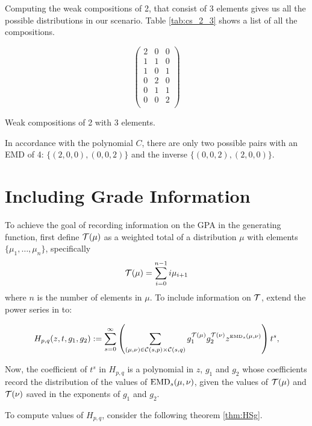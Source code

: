 \documentclass[12pt,letterpaper,oneside,openany]{book}
\begin{document}
Computing the weak compositions of 2, that consist of 3 elements gives us all the possible distributions in our scenario. Table \ref{tab:cs_2_3} shows a list of all the compositions.

\begin{table}
	\centering
	
	$$\begin{pmatrix}
	2 & 0 & 0 \\
	1 & 1 & 0 \\
	1 & 0 & 1 \\
	0 & 2 & 0 \\
	0 & 1 & 1 \\
	0 & 0 & 2 \\
	\end{pmatrix}$$
	
	
	\caption{Weak compositions of 2 with 3 elements.}
	\label{tab:cs_2_3}
\end{table}



In accordance with the polynomial $C$, there are only two possible pairs with an EMD of 4: $\{(2, 0, 0), (0, 0, 2)\}$ and the inverse  $\{(0,0,2),(2,0,0)\}$.

\setcounter{section}{1}
\section{Including Grade Information}
To achieve the goal of recording information on the GPA in the generating function, first define ${\mathcal{T}}(\mu)$  as a weighted total of a distribution $\mu$ with elements $\{\mu_1, …, \mu_n\}$, specifically
$${\mathcal{T}}(\mu) = \sum_{i=0}^{n-1}i\mu_{i+1}$$
where $n$ is the number of elements in $\mu$. 
To include information on ${\mathcal{T}}$, extend the power series in \cite{bourn2019expected} to:

\[
H_{p,q}(z,t, g_1, g_2) := \sum_{s=0}^\infty \left( \sum_{(\mu,\nu) \in {\mathcal{C}}(s,p) \times {\mathcal{C}}(s,q)}
g_1^{{\mathcal{T}}(\mu)}g_2^{{\mathcal{T}}(\nu)}z^{\tiny {\mbox{EMD}_s}(\mu,\nu)} \right) t^s,
\] 

Now, the coefficient of $t^s$ in $H_{p,q}$ is a polynomial in $z$, $g_1$ and $g_2$ whose coefficients record the distribution of  the values of ${\mbox{EMD}_s}(\mu, \nu)$, given the values of ${\mathcal{T}}(\mu)$ and ${\mathcal{T}}(\nu)$ saved in the exponents of $g_1$ and $g_2$.

To compute values of $H_{p,q}$, consider the following theorem \ref{thm:HSg}.
\end{document}
